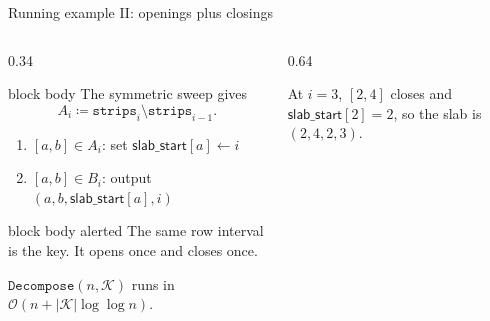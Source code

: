 \documentclass[aspectratio=169,11pt]{beamer}
\newcommand{\Oh}{\mathcal{O}}
\newcommand{\strips}{\mathtt{strips}}
\begin{document}
\begin{frame}{Running example II: openings plus closings}
\begin{columns}[T,onlytextwidth]
\begin{column}{0.34\textwidth}
\begin{beamercolorbox}[wd=\linewidth,sep=0.75ex,rounded=true]{block body}
\small The symmetric sweep gives
\[
A_i \coloneqq \strips_i\setminus \strips_{i-1}.
\]
\end{beamercolorbox}

\smallskip
{\small
\begin{enumerate}
\setlength\itemsep{0.28em}
\item $[a,b]\in A_i$: set $\mathsf{slab\_start}[a]\gets i$
\item $[a,b]\in B_i$: output $(a,b,\mathsf{slab\_start}[a],i)$
\end{enumerate}
}

\begin{beamercolorbox}[wd=\linewidth,sep=0.7ex,rounded=true]{block body alerted}
\footnotesize The same row interval is the key. It opens once and closes once.
\end{beamercolorbox}

\smallskip
{\footnotesize $\mathtt{Decompose}(n,\mathcal{K})$ runs in $\Oh(n+|\mathcal{K}|\log\log n)$.}
\end{column}

\begin{column}{0.64\textwidth}
\centering
{\scriptsize
\renewcommand{\arraystretch}{1.28}
}

\vspace{0.3em}
{\scriptsize\color{gray!75!black}At $i=3$, $[2,4]$ closes and $\mathsf{slab\_start}[2]=2$, so the slab is $(2,4,2,3)$.}


\end{column}
\end{columns}
\end{frame}
\end{document}
